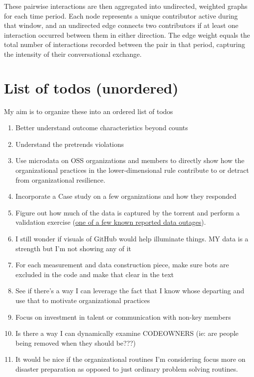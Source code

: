 \documentclass[12pt,notitlepage]{article}
\begin{document}
These pairwise interactions are then aggregated into undirected, weighted graphs for each time period.
Each node represents a unique contributor active during that window, and an undirected edge connects two contributors if at least one interaction occurred between them in either direction.
The edge weight equals the total number of interactions recorded between the pair in that period, capturing the intensity of their conversational exchange.

\section{List of todos (unordered)}
My aim is to organize these into an ordered list of todos

\begin{enumerate}
    \item Better understand outcome characteristics beyond counts
    \item Understand the pretrends violations
    \item Use microdata on OSS organizations and members to directly show how the organizational practices in the lower-dimensional rule contribute to or detract from organizational resilience. 
    \item Incorporate a Case study on a few organizations and how they responded
    \item Figure out how much of the data is captured by the torrent and perform a validation exercise (\href{https://GitHub.com/igrigorik/gharchive.org/issues/290\#issuecomment-1923017346}{one of a few known reported data outages}).
    \item I still wonder if visuals of GitHub would help illuminate things.
MY data is a strength but I'm not showing any of it
    \item For each measurement and data construction piece, make sure bots are excluded in the code and make that clear in the text
    \item See if there's a way I can leverage the fact that I know whose departing and use that to motivate organizational practices
    \item Focus on investment in talent or communication with non-key members
    \item Is there a way I can dynamically examine CODEOWNERS (ie: are people being removed when they should be???)
    \item It would be nice if the organizational routines I'm considering focus more on disaster preparation as opposed to just ordinary problem solving routines. 

\end{enumerate}
\end{document}
